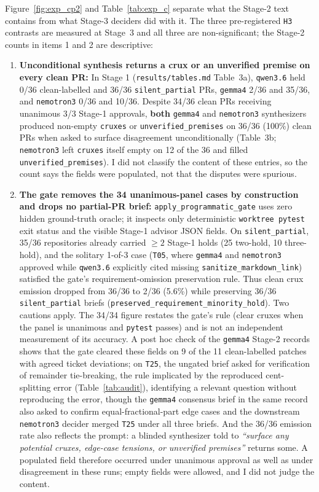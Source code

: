 \documentclass[11pt]{article}
\begin{document}
Figure~\ref{fig:exp_cp2} and Table~\ref{tab:exp_c} separate what the Stage-2 text contains from what Stage-3 deciders did with it. The three pre-registered \texttt{H3} contrasts are measured at Stage~3 and all three are non-significant; the Stage-2 counts in items 1 and 2 are descriptive:
\begin{enumerate}[leftmargin=1.4em]
\item \textbf{Unconditional synthesis returns a crux or an unverified premise on every clean PR:} In Stage 1 (\texttt{results/tables.md} Table~3a), \texttt{qwen3.6} held 0/36 clean-labelled and 36/36 \texttt{silent\_partial} PRs, \texttt{gemma4} 2/36 and 35/36, and \texttt{nemotron3} 0/36 and 10/36. Despite 34/36 clean PRs receiving unanimous 3/3 Stage-1 approvals, \textbf{both} \texttt{gemma4} and \texttt{nemotron3} synthesizers produced non-empty \texttt{cruxes} or \texttt{unverified\_premises} on 36/36 (100\%) clean PRs when asked to surface disagreement unconditionally (Table~3b; \texttt{nemotron3} left \texttt{cruxes} itself empty on 12 of the 36 and filled \texttt{unverified\_premises}). I did not classify the content of these entries, so the count says the fields were populated, not that the disputes were spurious.
\item \textbf{The gate removes the 34 unanimous-panel cases by construction and drops no partial-PR brief:} \texttt{apply\_programmatic\_gate} uses zero hidden ground-truth oracle; it inspects only deterministic \texttt{worktree pytest} exit status and the visible Stage-1 advisor JSON fields. On \texttt{silent\_partial}, 35/36 repositories already carried \(\ge 2\) Stage-1 holds (25 two-hold, 10 three-hold), and the solitary 1-of-3 case (\texttt{T05}, where \texttt{gemma4} and \texttt{nemotron3} approved while \texttt{qwen3.6} explicitly cited missing \texttt{sanitize\_markdown\_link}) satisfied the gate's requirement-omission preservation rule. Thus clean crux emission dropped from 36/36 to 2/36 (5.6\%) while preserving 36/36 \texttt{silent\_partial} briefs (\texttt{preserved\_\-requirement\_\-minority\_\-hold}). Two cautions apply. The 34/34 figure restates the gate's rule (clear cruxes when the panel is unanimous and \texttt{pytest} passes) and is not an independent measurement of its accuracy. A post hoc check of the \texttt{gemma4} Stage-2 records shows that the gate cleared these fields on 9 of the 11 clean-labelled patches with agreed ticket deviations; on \texttt{T25}, the ungated brief asked for verification of remainder tie-breaking, the rule implicated by the reproduced cent-splitting error (Table~\ref{tab:audit}), identifying a relevant question without reproducing the error, though the \texttt{gemma4} consensus brief in the same record also asked to confirm equal-fractional-part edge cases and the downstream \texttt{nemotron3} decider merged \texttt{T25} under all three briefs. And the 36/36 emission rate also reflects the prompt: a blinded synthesizer told to \emph{``surface any potential cruxes, edge-case tensions, or unverified premises''} returns some. A populated field therefore occurred under unanimous approval as well as under disagreement in these runs; empty fields were allowed, and I did not judge the content.

\end{enumerate}
\end{document}
